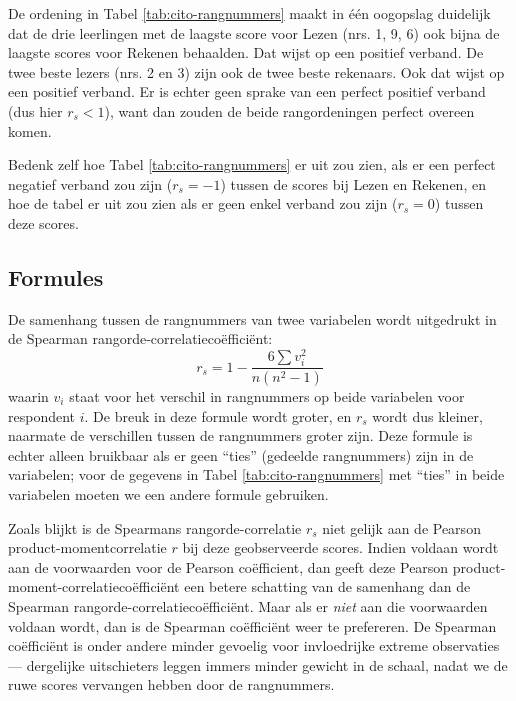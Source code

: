 \documentclass[
]{book}
\begin{document}
De ordening in Tabel \ref{tab:cito-rangnummers} maakt in één oogopslag duidelijk dat
de drie leerlingen met de laagste score voor Lezen (nrs. 1, 9, 6) ook
bijna de laagste scores voor Rekenen behaalden. Dat wijst op een
positief verband. De twee beste lezers (nrs. 2 en 3) zijn ook de twee
beste rekenaars. Ook dat wijst op een positief verband. Er is echter
geen sprake van een perfect positief verband (dus hier \(r_s<1\)), want
dan zouden de beide rangordeningen perfect overeen komen.

Bedenk zelf hoe Tabel \ref{tab:cito-rangnummers} er uit zou zien, als er een perfect
negatief verband zou zijn (\(r_s=-1\)) tussen de scores bij Lezen en
Rekenen, en hoe de tabel er uit zou zien als er geen enkel verband zou
zijn (\(r_s=0\)) tussen deze scores.

\subsection{Formules}\label{formules-4}

De samenhang tussen de rangnummers van twee variabelen wordt uitgedrukt
in de Spearman rangorde-correlatiecoëfficiënt:
\begin{equation}
    r_s = 1 - \frac{6 \sum v_i^2}{n(n^2-1)}
  \label{eq:spearman}
\end{equation}
waarin \(v_i\) staat voor
het verschil in rangnummers op beide variabelen voor respondent \(i\). De
breuk in deze formule wordt groter, en \(r_s\) wordt dus kleiner, naarmate
de verschillen tussen de rangnummers groter zijn.
Deze formule is echter alleen bruikbaar als er geen ``ties'' (gedeelde rangnummers) zijn in de variabelen; voor de gegevens in Tabel \ref{tab:cito-rangnummers} met ``ties'' in beide variabelen moeten we een andere formule gebruiken.

Zoals blijkt is de Spearmans rangorde-correlatie \(r_s\) niet gelijk aan
de Pearson product-momentcorrelatie \(r\) bij deze geobserveerde scores.
Indien voldaan wordt aan de voorwaarden voor de Pearson coëfficient, dan
geeft deze Pearson product-moment-correlatiecoëfficiënt een betere
schatting van de samenhang dan de Spearman
rangorde-correlatiecoëfficiënt. Maar als er \emph{niet} aan die voorwaarden
voldaan wordt, dan is de Spearman coëfficiënt weer te prefereren. De
Spearman coëfficiënt is onder andere minder gevoelig voor invloedrijke
extreme observaties --- dergelijke uitschieters leggen immers minder
gewicht in de schaal, nadat we de ruwe scores vervangen hebben door de
rangnummers.
\end{document}
